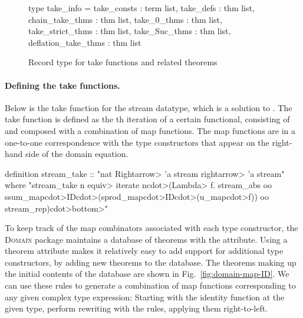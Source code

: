 \begin{figure}
\begin{hscode}
type take_info =
  {
    take_consts         : term list,   take_defs     : thm list,
    chain_take_thms     : thm list,    take_0_thms   : thm list,
    take_strict_thms    : thm list,    take_Suc_thms : thm list,
    deflation_take_thms : thm list
  }
\end{hscode}
\caption{Record type for take functions and related theorems}
\label{fig:domain-take-info}
\end{figure}

\paragraph{Defining the take functions.} Below is the take function for the stream data\-type, which is a solution to . The take function  is defined as the th iteration of a certain functional, consisting of  and  composed with a combination of map functions. The map functions are in a one-to-one correspondence with the type constructors that appear on the right-hand side of the domain equation.
%
\begin{isacode}
definition stream_take :: "nat \<Rightarrow> 'a stream \<rightarrow> 'a stream"
  where "stream_take n \<equiv> iterate n\<cdot>(\<Lambda> f.
    stream_abs oo ssum_map\<cdot>ID\<cdot>(sprod_map\<cdot>ID\<cdot>(u_map\<cdot>f)) oo stream_rep)\<cdot>\<bottom>"
\end{isacode}

To keep track of the map combinators associated with each type constructor, the \textsc{Domain} package maintains a database of theorems with the  attribute. Using a theorem attribute makes it relatively easy to add support for additional type constructors, by adding new theorems to the database. The theorems making up the initial contents of the database are shown in Fig.~\ref{fig:domain-map-ID}. We can use these rules to generate a combination of map functions corresponding to any given complex type expression: Starting with the identity function  at the given type, perform rewriting with the  rules, applying them right-to-left.

